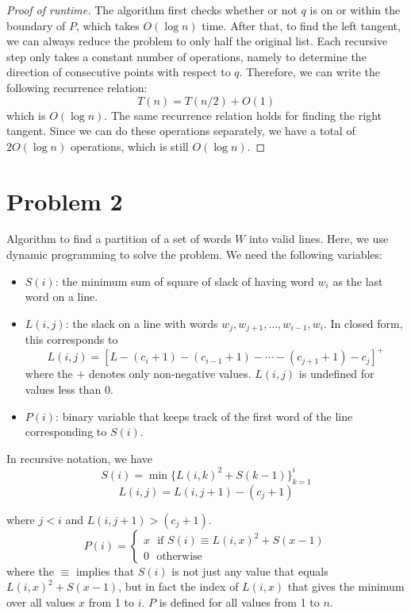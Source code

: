 \documentclass{article}
\begin{document}
\begin{enumerate}[(a)]
\begin{proof}[Proof of runtime]
The algorithm first checks whether or not $q$ is on or within the boundary of $P$, which takes $O(\log n)$ time. After that, to find the left tangent, we can always reduce the problem to only half the original list. Each recursive step only takes a constant number of operations, namely to determine the direction of consecutive points with respect to $q$. Therefore, we can write the following recurrence relation:
$$T(n) = T(n/2)+O(1)$$
which is $O(\log n)$. The same recurrence relation holds for finding the right tangent. Since we can do these operations separately, we have a total of $2O(\log n)$ operations, which is still $O(\log n)$.
\end{proof}
\end{enumerate}

\pagebreak

\section*{Problem 2}
Algorithm to find a partition of a set of words $W$ into valid lines. Here, we use dynamic programming to solve the problem. We need the following variables:
\begin{itemize}
\item $S(i)$: the minimum sum of square of slack of having word $w_i$ as the last word on a line.
\item $L(i,j)$: the slack on a line with words $w_j, w_{j+1},\dots,w_{i-1},w_i$. In closed form, this corresponds to
$$L(i,j) = [L-(c_i+1)-(c_{i-1}+1)-\cdots -(c_{j+1}+1)-c_j]^+$$
where the $+$ denotes only non-negative values. $L(i,j)$ is undefined for values less than 0.
\item $P(i)$: binary variable that keeps track of the first word of the line corresponding to $S(i)$.
\end{itemize}
In recursive notation, we have
$$S(i) = \min\Big\{ L(i,k)^2 + S(k-1) \Big \}_{k=1}^i$$
$$L(i,j) = L(i,j+1)-(c_j+1)$$




where $j<i$ and $L(i,j+1)>(c_j+1)$. 
$$P(i) = \begin{cases}
x \ \ \ \text{if } S(i) \equiv L(i,x)^2+S(x-1) \\
0 \ \ \ \text{otherwise}
\end{cases}  $$
where the $\equiv$ implies that $S(i)$ is not just any value that equals $L(i,x)^2+S(x-1)$, but in fact the index of $L(i,x)$ that gives the minimum over all values $x$ from 1 to $i$. $P$ is defined for all values from 1 to $n$.
\end{document}
